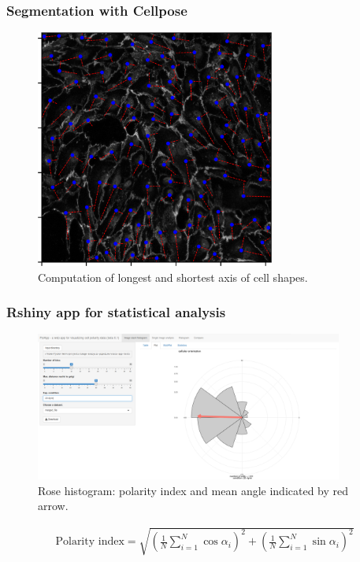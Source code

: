\documentclass[14pt]{beamer}
\begin{document}
\begin{frame}[plain]
\frametitle{\normalsize \bf Segmentation with Cellpose}

\centering

\tiny
\begin{figure}
  \centering
  \includegraphics[width=0.7\textwidth]{images/image_001_cellshape_orientation.png}\\
  \tiny
  Computation of longest and shortest axis of cell shapes.
\end{figure}

\end{frame}





\begin{frame}
\frametitle{\normalsize \bf Rshiny app for statistical analysis}
\scriptsize
\centering

\begin{figure}
  \centering
  \includegraphics[width=0.9\textwidth]{images/polarity_merged.png}\\
  \tiny
  Rose histogram: polarity index and mean angle indicated by red arrow.
\end{figure}

\begin{align}
    \text{Polarity index} = \sqrt{ \left(\frac{1}{N} \sum^N_{i=1} \cos \alpha_i \right)^2 + \left(\frac{1}{N} \sum^N_{i=1} \sin \alpha_i \right)^2}
\end{align}



\end{frame}
\end{document}
